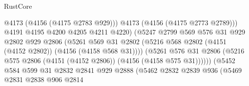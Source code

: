 \begin{lexlean}{RustCore}
\begin{coremodule}
                                            @4173
                                            (@4156 (@4175 @2783 @929)))
                                          @4173
                                          (@4156 (@4175 @2773 @2789)))
                                        @4191
                                        @4195
                                        @4200
                                        @4205
                                        @4211
                                        @4220)
                                      (@5247
                                        @2799
                                        @569
                                        @576
                                        @31
                                        @929
                                        @2802
                                        @929
                                        @2806
                                        (@5261
                                          @569
                                          @31
                                          @2802
                                          (@5216
                                            @568
                                            @2802
                                            (@4151 (@4152 @2802))
                                            (@4156 (@4158 @568 @31))))
                                        (@5261
                                          @576
                                          @31
                                          @2806
                                          (@5216
                                            @575
                                            @2806
                                            (@4151 (@4152 @2806))
                                            (@4156 (@4158 @575 @31))))))
                                    (@5452
                                      @584
                                      @599
                                      @31
                                      @2832
                                      @2841
                                      @929
                                      @2888
                                      (@5462
                                        @2832
                                        @2839
                                        @936
                                        (@5469
                                          @2831
                                          @2838
                                          @906
                                          @2814

\end{coremodule}
\end{lexlean}
